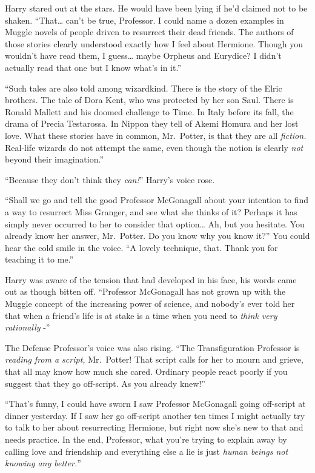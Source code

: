 Harry stared out at the stars. He would have been lying if he'd claimed
not to be shaken. ``That\ldots{} can't be true, Professor. I could name
a dozen examples in Muggle novels of people driven to resurrect their
dead friends. The authors of those stories clearly understood exactly
how I feel about Hermione. Though you wouldn't have read them, I
guess\ldots{} maybe Orpheus and Eurydice? I didn't actually read that
one but I know what's in it.''

``Such tales are also told among wizardkind. There is the story of the
Elric brothers. The tale of Dora Kent, who was protected by her son
Saul. There is Ronald Mallett and his doomed challenge to Time. In Italy
before its fall, the drama of Precia Testarossa. In Nippon they tell of
Akemi Homura and her lost love. What these stories have in common,
Mr.~Potter, is that they are all \emph{fiction.} Real-life wizards do
not attempt the same, even though the notion is clearly \emph{not}
beyond their imagination.''

``Because they don't think they \emph{can!}'' Harry's voice rose.

``Shall we go and tell the good Professor McGonagall about your
intention to find a way to resurrect Miss Granger, and see what she
thinks of it? Perhaps it has simply never occurred to her to consider
that option\ldots{} Ah, but you hesitate. You already know her answer,
Mr.~Potter. Do you know why you know it?'' You could hear the cold smile
in the voice. ``A lovely technique, that. Thank you for teaching it to
me.''

Harry was aware of the tension that had developed in his face, his words
came out as though bitten off. ``Professor McGonagall has not grown up
with the Muggle concept of the increasing power of science, and nobody's
ever told her that when a friend's life is at stake is a time when you
need to \emph{think very rationally} -''

The Defense Professor's voice was also rising. ``The Transfiguration
Professor is \emph{reading from a script,} Mr.~Potter! That script calls
for her to mourn and grieve, that all may know how much she cared.
Ordinary people react poorly if you suggest that they go off-script. As
you already knew!''

``That's funny, I could have sworn I saw Professor McGonagall going
off-script at dinner yesterday. If I saw her go off-script another ten
times I might actually try to talk to her about resurrecting Hermione,
but right now she's new to that and needs practice. In the end,
Professor, what you're trying to explain away by calling love and
friendship and everything else a lie is just \emph{human beings not
knowing any better.}''

